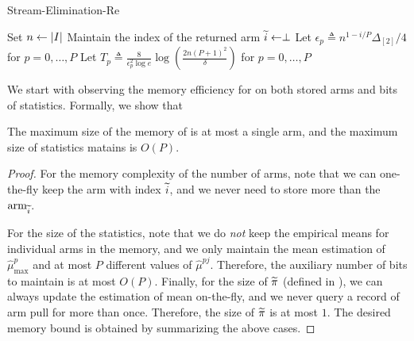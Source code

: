 \FloatBarrier
\begin{algorithm}
	\caption{Stream-Elimination-Re}\label{alg:improved}
	Set \(n \gets \left| I \right|\)\; 
	Maintain the index of the returned arm $\widetilde{i} \gets \perp$\;
	Let \(\epsilon_p \triangleq n^{1-i/P}\Delta_{[2]} / 4\) for \(p = 0, \dotsc, P\) \;
	Let \(T_p \triangleq \frac{8}{\epsilon^2_p \log e} \log\left(\frac{2 n (P + 1)^2}{\delta}\right) \) for \(p = 0, \dotsc, P\)\; 
\end{algorithm}

\FloatBarrier


We start with observing the memory efficiency for  on both stored arms and bits of statistics. Formally, we show that
\begin{lemma}
\label{lem:improved-memory}
The maximum size of the memory of  is at most a single arm, and the maximum size of statistics  matains is $O(P)$.
\end{lemma}
\begin{proof}
	For the memory complexity of the number of arms, note that we can one-the-fly keep the arm with index $\widetilde{i}$, and we never need to store more than the $\textnormal{arm}_{\widetilde{i}}$. 
	
	For the size of the statistics, note that we do \emph{not} keep the empirical means for individual arms in the memory, and we only maintain the mean estimation of $\hat\mu^p_{\max}$ and at most $P$ different values of $\hat\mu^{p{j}}$. Therefore, the auxiliary number of bits to maintain is at most $O(P)$. Finally, for the size of $\widetilde{\pi}$ (defined in ), we can always update the estimation of mean on-the-fly, and we never query a record of arm pull for more than once. Therefore, the size of $\widetilde{\pi}$ is at most $1$. The desired memory bound is obtained by summarizing the above cases.
\end{proof}


